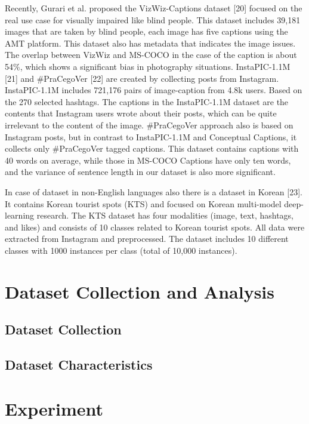 \documentclass[10pt]{cai}
\begin{document}
Recently, Gurari et al. proposed the VizWiz-Captions dataset [20] focused on the real use case for visually impaired like blind people. 
This dataset includes 39,181 images that are taken by blind people, each image has five captions using the AMT platform. 
This dataset also has metadata that indicates the image issues. 
The overlap between VizWiz and MS-COCO in the case of the caption is about 54\%, which shows a significant bias in photography situations.
InstaPIC-1.1M [21] and \#PraCegoVer [22] are created by collecting posts from Instagram. 
InstaPIC-1.1M includes 721,176 pairs of image-caption from 4.8k users. 
Based on the 270 selected hashtags. 
The captions in the InstaPIC-1.1M dataset are the contents that Instagram users wrote about their posts, which can be quite irrelevant to the content of the image. 
\#PraCegoVer approach also is based on Instagram posts, but in contrast to InstaPIC-1.1M and Conceptual Captions, it collects only \#PraCegoVer tagged captions. 
This dataset contains captions with 40 words on average, while those in MS-COCO Captions have only ten words, and the variance of sentence length in our dataset is also more significant.

In case of dataset in non-English languages also there is a dataset in Korean [23]. It contains Korean tourist spots (KTS) and focused on Korean multi-model deep-learning research. 
The KTS dataset has four modalities (image, text, hashtags, and likes) and consists of 10 classes related to Korean tourist spots. 
All data were extracted from Instagram and preprocessed. 
The dataset includes 10 different classes with 1000 instances per class (total of 10,000 instances).

\section{Dataset Collection and Analysis}
\label{dataset}

\subsection{Dataset Collection}
\subsection{Dataset Characteristics}

\section{Experiment}
\label{test}
\end{document}
